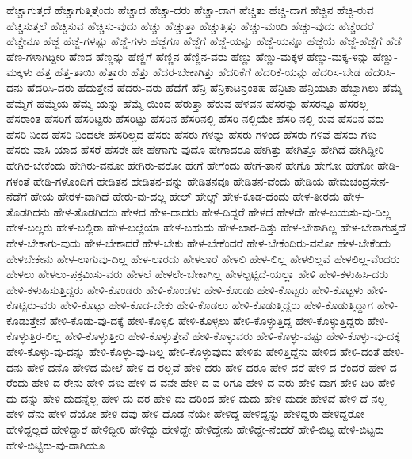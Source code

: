 {ಹೆಚ್ಚಾಗುತ್ತದೆ
ಹೆಚ್ಚಾಗುತ್ತಿತ್ತೆಂದು
ಹೆಚ್ಚಾದ
ಹೆಚ್ಚಾ-ದರು
ಹೆಚ್ಚಾ-ದಾಗ
ಹೆಚ್ಚಿತು
ಹೆಚ್ಚಿ-ದಾಗ
ಹೆಚ್ಚಿನ
ಹೆಚ್ಚಿ-ರುವ
ಹೆಚ್ಚಿಸುತ್ತಲೆ
ಹೆಚ್ಚಿಸುವ
ಹೆಚ್ಚಿಸು-ವುದು
ಹೆಚ್ಚು
ಹೆಚ್ಚುತ್ತಾ
ಹೆಚ್ಚುತ್ತಿತ್ತು
ಹೆಚ್ಚು-ಮಂದಿ
ಹೆಚ್ಚು-ವುದು
ಹೆಚ್ಚೆಂದರೆ
ಹೆಚ್ಚೇನೂ
ಹೆಜ್ಜೆ
ಹೆಜ್ಜೆ-ಗಳಷ್ಟು
ಹೆಜ್ಜೆ-ಗಳು
ಹೆಜ್ಜೆಗೂ
ಹೆಜ್ಜೆಗೆ
ಹೆಜ್ಜೆ-ಯನ್ನು
ಹೆಜ್ಜೆ-ಯನ್ನೂ
ಹೆಜ್ಜೆಯೆ
ಹೆಜ್ಜೆ-ಹೆಜ್ಜೆಗೆ
ಹೆಡೆ
ಹೆಣ-ಗಳಾಗಿದ್ದೀರಿ
ಹೆಣದ
ಹೆಣ್ಣನ್ನು
ಹೆಣ್ಣಿಗೆ
ಹೆಣ್ಣಿನ
ಹೆಣ್ಣಿನ-ವರು
ಹೆಣ್ಣು
ಹೆಣ್ಣು-ಮಕ್ಕಳ
ಹೆಣ್ಣು-ಮಕ್ಕ-ಳನ್ನು
ಹೆಣ್ಣು-ಮಕ್ಕಳು
ಹೆತ್ತ
ಹೆತ್ತ-ತಾಯಿ
ಹೆತ್ತಾರು
ಹೆತ್ತು
ಹೆದರ-ಬೇಕಾಗಿತ್ತು
ಹೆದರಿಕೆಗೆ
ಹೆದರಿಕೆ-ಯನ್ನು
ಹೆದರಿಸ-ಬೇಡ
ಹೆದರಿಸಿ-ದನು
ಹೆದರಿಸಿ-ದರು
ಹೆದುತ್ತೇನೆ
ಹೆದರು-ವರು
ಹೆದೆಗೆ
ಹೆನ್ರಿ
ಹೆನ್ರಿಕಾಟನ್ರಂತಹ
ಹೆನ್ರಿಟಾ
ಹೆನ್ರಿಯಟಾ
ಹೆಬ್ಬಾಗಿಲು
ಹೆಮ್ಮೆ
ಹೆಮ್ಮೆಗೆ
ಹೆಮ್ಮೆಯ
ಹೆಮ್ಮೆ-ಯನ್ನು
ಹೆಮ್ಮೆ-ಯಿಂದ
ಹೆರುತ್ತಾ
ಹೆರುವ
ಹೆಳವನ
ಹೆಸರನ್ನು
ಹೆಸರನ್ನೂ
ಹೆಸರಲ್ಲ
ಹೆಸರಾಂತ
ಹೆಸರಿಗೆ
ಹೆಸರಿಟ್ಟರು
ಹೆಸರಿಟ್ಟು
ಹೆಸರಿನ
ಹೆಸರಿನಲ್ಲಿ
ಹೆಸರಿ-ನಲ್ಲಿಯೇ
ಹೆಸರಿ-ನಲ್ಲಿ-ರುವ
ಹೆಸರಿನ-ವರು
ಹೆಸರಿ-ನಿಂದ
ಹೆಸರಿ-ನಿಂದಲೇ
ಹೆಸರಿಲ್ಲದ
ಹೆಸರು
ಹೆಸರು-ಗಳನ್ನು
ಹೆಸರು-ಗಳಿಂದ
ಹೆಸರು-ಗಳಿವೆ
ಹೆಸರು-ಗಳು
ಹೆಸರು-ವಾಸಿ-ಯಾದ
ಹೆಸರೆ
ಹೆಸರೇ
ಹೇ
ಹೇಗಾಗು-ವುದೊ
ಹೇಗಾದರೂ
ಹೇಗಿತ್ತು
ಹೇಗಿತ್ತೊ
ಹೇಗಿದೆ
ಹೇಗಿದ್ದೀರಿ
ಹೇಗಿರ-ಬೇಕೆಂದು
ಹೇಗಿರು-ವನೋ
ಹೇಗಿರು-ವರೋ
ಹೇಗೆ
ಹೇಗೆಂದು
ಹೇಗೆ-ತಾನೆ
ಹೇಗೊ
ಹೇಗೋ
ಹೇಗೋ
ಹೇಡಿ-ಗಳಂತೆ
ಹೇಡಿ-ಗಳೊಂದಿಗೆ
ಹೇಡಿತನ
ಹೇಡಿತನ-ವನ್ನು
ಹೇಡಿತನವೂ
ಹೇಡಿತನ-ವೆಂದು
ಹೇಡಿಯ
ಹೇಮಚಂದ್ರಸೇನ-ನೆಡೆಗೆ
ಹೇಯ
ಹೇರಳ-ವಾಗಿದೆ
ಹೇರು-ವು-ದಲ್ಲ
ಹೇಲ್
ಹೇಲ್ಸ್
ಹೇಳ-ಕೂಡ-ದೆಂದು
ಹೇಳ-ತೀರದು
ಹೇಳ-ತೊಡಗಿದನು
ಹೇಳ-ತೊಡಗಿದರು
ಹೇಳದ
ಹೇಳ-ದಾದರು
ಹೇಳ-ದಿದ್ದರೆ
ಹೇಳದೆ
ಹೇಳದೇ
ಹೇಳ-ಬಯಸು-ವು-ದಿಲ್ಲ
ಹೇಳ-ಬಲ್ಲರು
ಹೇಳ-ಬಲ್ಲಿರಾ
ಹೇಳ-ಬಲ್ಲೆಯಾ
ಹೇಳ-ಬಹುದು
ಹೇಳ-ಬಾರ-ದಿತ್ತು
ಹೇಳ-ಬೇಕಾಗಿಲ್ಲ
ಹೇಳ-ಬೇಕಾಗುತ್ತದೆ
ಹೇಳ-ಬೇಕಾಗು-ವುದು
ಹೇಳ-ಬೇಕಾದರೆ
ಹೇಳ-ಬೇಕು
ಹೇಳ-ಬೇಕೆಂದರೆ
ಹೇಳ-ಬೇಕೆಂದಿರು-ವನೋ
ಹೇಳ-ಬೇಕೆಂದು
ಹೇಳಬೇಕೇನು
ಹೇಳ-ಲಾಗುವು-ದಿಲ್ಲ
ಹೇಳ-ಲಾರದು
ಹೇಳಲಾರೆ
ಹೇಳಲಿ
ಹೇಳ-ಲಿಲ್ಲ
ಹೇಳಲಿಲ್ಲವೆ
ಹೇಳಲಿಲ್ಲ-ವೆಂದರು
ಹೇಳಲು
ಹೇಳಲು-ಪಕ್ರಮಿಸು-ವರು
ಹೇಳಲೆ
ಹೇಳಲೇ-ಬೇಕಾಗಿಲ್ಲ
ಹೇಳಲ್ಪಟ್ಟಿದೆ-ಯಲ್ಲಾ
ಹೇಳಿ
ಹೇಳಿ-ಕಳುಹಿಸಿ-ದರು
ಹೇಳಿ-ಕಳುಹಿಸುತ್ತಿದ್ದರು
ಹೇಳಿ-ಕೊಂಡರು
ಹೇಳಿ-ಕೊಂಡಳು
ಹೇಳಿ-ಕೊಂಡು
ಹೇಳಿ-ಕೊಟ್ಟರು
ಹೇಳಿ-ಕೊಟ್ಟಳು
ಹೇಳಿ-ಕೊಟ್ಟಿರು-ವರು
ಹೇಳಿ-ಕೊಟ್ಟು
ಹೇಳಿ-ಕೊಡ-ಬೇಕು
ಹೇಳಿ-ಕೊಡಲು
ಹೇಳಿ-ಕೊಡುತ್ತಿದ್ದರು
ಹೇಳಿ-ಕೊಡುತ್ತಿದ್ದಾಗ
ಹೇಳಿ-ಕೊಡುತ್ತೇನೆ
ಹೇಳಿ-ಕೊಡು-ವು-ದಕ್ಕೆ
ಹೇಳಿ-ಕೊಳ್ಳಲಿ
ಹೇಳಿ-ಕೊಳ್ಳಲು
ಹೇಳಿ-ಕೊಳ್ಳುತ್ತಿದ್ದ
ಹೇಳಿ-ಕೊಳ್ಳುತ್ತಿದ್ದರು
ಹೇಳಿ-ಕೊಳ್ಳುತ್ತಿರ-ಲಿಲ್ಲ
ಹೇಳಿ-ಕೊಳ್ಳುತ್ತೀರಿ
ಹೇಳಿ-ಕೊಳ್ಳುತ್ತೇನೆ
ಹೇಳಿ-ಕೊಳ್ಳುವರು
ಹೇಳಿ-ಕೊಳ್ಳು-ವಷ್ಟು
ಹೇಳಿ-ಕೊಳ್ಳು-ವು-ದಕ್ಕೆ
ಹೇಳಿ-ಕೊಳ್ಳು-ವು-ದನ್ನು
ಹೇಳಿ-ಕೊಳ್ಳು-ವು-ದಿಲ್ಲ
ಹೇಳಿ-ಕೊಳ್ಳುವುದು
ಹೇಳಿತು
ಹೇಳಿತ್ತಿದ್ದೆನು
ಹೇಳಿದ
ಹೇಳಿ-ದಂತೆ
ಹೇಳಿ-ದನು
ಹೇಳಿ-ದನೊ
ಹೇಳಿದ-ಮೇಲೆ
ಹೇಳಿ-ದ-ರಲ್ಲವೆ
ಹೇಳಿ-ದರು
ಹೇಳಿ-ದರೂ
ಹೇಳಿ-ದರೆ
ಹೇಳಿ-ದ-ರೆಂದರೆ
ಹೇಳಿ-ದ-ರೆಂದು
ಹೇಳಿ-ದ-ರೇನು
ಹೇಳಿ-ದಳು
ಹೇಳಿ-ದ-ವನೇ
ಹೇಳಿ-ದ-ವ-ರಿಗೂ
ಹೇಳಿ-ದ-ವರು
ಹೇಳಿ-ದಾಗ
ಹೇಳಿ-ದಿರಿ
ಹೇಳಿ-ದು-ದನ್ನು
ಹೇಳಿ-ದುದನ್ನೆಲ್ಲ
ಹೇಳಿ-ದು-ದರ
ಹೇಳಿ-ದು-ದರಿಂದ
ಹೇಳಿ-ದುದು
ಹೇಳಿ-ದುದೇ
ಹೇಳಿದೆ
ಹೇಳಿ-ದೆ-ನಲ್ಲ
ಹೇಳಿ-ದೆನು
ಹೇಳಿ-ದೆಯೋ
ಹೇಳಿ-ದೆವು
ಹೇಳಿ-ದೊಡ-ನೆಯೇ
ಹೇಳಿದ್ದ
ಹೇಳಿದ್ದನ್ನು
ಹೇಳಿದ್ದರು
ಹೇಳಿದ್ದರೋ
ಹೇಳಿದ್ದಲ್ಲದೆ
ಹೇಳಿದ್ದಾರೆ
ಹೇಳಿದ್ದೀರಿ
ಹೇಳಿದ್ದು
ಹೇಳಿದ್ದೇ
ಹೇಳಿದ್ದೇನು
ಹೇಳಿದ್ದೇ-ನೆಂದರೆ
ಹೇಳಿ-ಬಿಟ್ಟ
ಹೇಳಿ-ಬಿಟ್ಟರು
ಹೇಳಿ-ಬಿಟ್ಟಿರು-ವು-ದಾಗಿಯೂ
}
